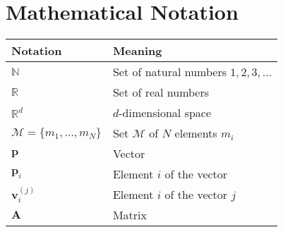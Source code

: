 
\chapter*{Mathematical Notation} \label{Notation}

\newcommand{\tabdummy}{\midrule[0pt]}

\begin{tabular}{p{}p{}}
  \textbf{Notation} & \textbf{Meaning} \\ \toprule[1pt]
   $\mathbb{N}$ & Set of natural numbers ${1, 2, 3, \ldots}$ \\ \tabdummy
   $\mathbb{R}$ & Set of real numbers \\ \tabdummy
   $\mathbb{R}^d$ & $d$-dimensional space\\ \tabdummy
   $\mathcal{M} = \{m_1,\ldots,m_N\}$ & Set $\mathcal{M}$ of $N$ elements $m_i$ \\ \tabdummy
   $\mathbf{p}$ & Vector\\ \tabdummy
   $\mathbf{p}_i$ & Element $i$ of the vector \\ \tabdummy
   $\mathbf{v}^{(j)}_i$ & Element $i$ of the vector $j$ \\ \tabdummy
   $\mathbf{A}$ & Matrix
\end{tabular}
